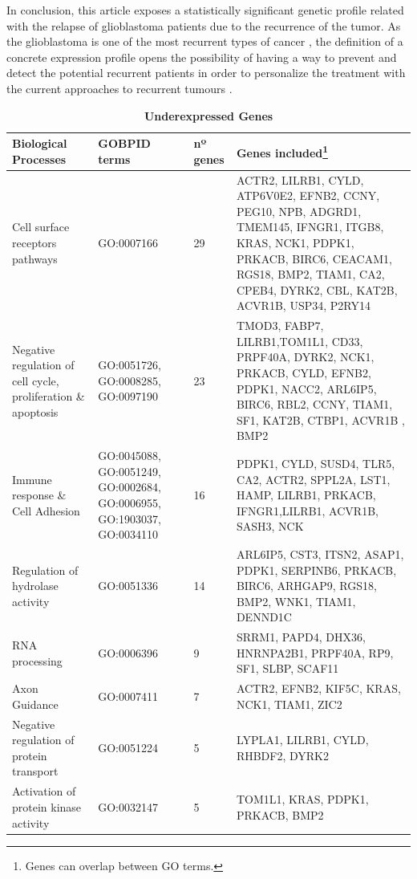 \documentclass[9pt,twocolumn,twoside]{gsajnl}
\begin{document}
In conclusion, this article exposes a statistically significant genetic profile related with the relapse of glioblastoma patients due to the recurrence of the tumor. As the glioblastoma is one of the most recurrent types of cancer \citep{Bleeker2012}, the definition of a concrete expression profile opens the possibility of having a way to prevent and detect the potential recurrent patients in order to personalize the treatment with the current approaches to recurrent tumours \citep{Weller2013}. 



\begin{table}[htbp]
\centering
\caption{\bf Underexpressed Genes}
\begin{tableminipage}{\textwidth}
\begin{tabularx}{\textwidth}{m{3cm}m{3.5cm}m{1.2cm}m{9.2cm}}
\hline
Biological Processes & GOBPID terms & nº genes & Genes included\footnote{Genes can overlap between GO terms.} \\
\hline

Cell surface receptors pathways & GO:0007166 & 29 & ACTR2, LILRB1, CYLD, ATP6V0E2, EFNB2, CCNY, PEG10, NPB, ADGRD1, TMEM145, IFNGR1, ITGB8, KRAS, NCK1, PDPK1, PRKACB, BIRC6, CEACAM1, RGS18, BMP2, TIAM1, CA2, CPEB4, DYRK2, CBL, KAT2B, ACVR1B, USP34, P2RY14\\

Negative regulation of cell cycle, proliferation \& apoptosis& GO:0051726, GO:0008285, GO:0097190 & 23 & TMOD3, FABP7, LILRB1,TOM1L1, CD33, PRPF40A, DYRK2, NCK1, PRKACB, CYLD, EFNB2, PDPK1, NACC2, ARL6IP5, BIRC6, RBL2, CCNY, TIAM1, SF1, KAT2B, CTBP1, ACVR1B , BMP2\\

Immune response \& Cell Adhesion & GO:0045088, GO:0051249, GO:0002684, GO:0006955, GO:1903037, GO:0034110  & 16 & PDPK1, CYLD, SUSD4, TLR5, CA2, ACTR2, SPPL2A, LST1, HAMP, LILRB1, PRKACB, IFNGR1,LILRB1, ACVR1B, SASH3, NCK\\

Regulation of hydrolase activity & GO:0051336 & 14 & ARL6IP5, CST3, ITSN2, ASAP1, PDPK1, SERPINB6, PRKACB, BIRC6, ARHGAP9, RGS18, BMP2, WNK1, TIAM1, DENND1C\\ 

RNA processing & GO:0006396 & 9 & SRRM1, PAPD4, DHX36, HNRNPA2B1, PRPF40A, RP9, SF1, SLBP, SCAF11\\

Axon Guidance & GO:0007411 & 7 & ACTR2, EFNB2, KIF5C, KRAS, NCK1, TIAM1, ZIC2\\

Negative regulation of protein transport & GO:0051224 & 5 & LYPLA1, LILRB1, CYLD, RHBDF2, DYRK2\\

Activation of protein kinase activity & GO:0032147 & 5 & TOM1L1, KRAS, PDPK1, PRKACB, BMP2\\
\hline
\end{tabularx}
  \label{tab:under}
\end{tableminipage}
\end{table}
\end{document}
